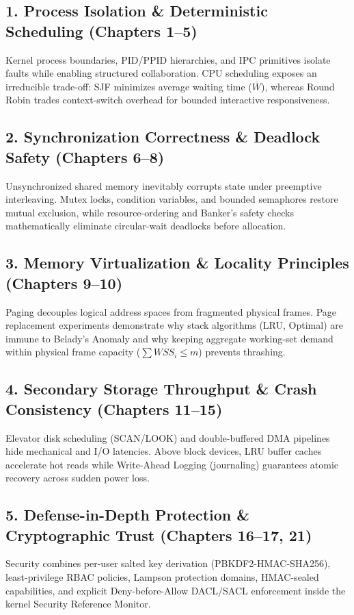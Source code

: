 \documentclass[11pt,a4paper]{report}
\begin{document}
\subsection*{1. Process Isolation \& Deterministic Scheduling (Chapters 1--5)}
Kernel process boundaries, PID/PPID hierarchies, and IPC primitives isolate faults while enabling structured collaboration. CPU scheduling exposes an irreducible trade-off: SJF minimizes average waiting time ($\overline{W}$), whereas Round Robin trades context-switch overhead for bounded interactive responsiveness.\par
\subsection*{2. Synchronization Correctness \& Deadlock Safety (Chapters 6--8)}
Unsynchronized shared memory inevitably corrupts state under preemptive interleaving. Mutex locks, condition variables, and bounded semaphores restore mutual exclusion, while resource-ordering and Banker's safety checks mathematically eliminate circular-wait deadlocks before allocation.\par
\subsection*{3. Memory Virtualization \& Locality Principles (Chapters 9--10)}
Paging decouples logical address spaces from fragmented physical frames. Page replacement experiments demonstrate why stack algorithms (LRU, Optimal) are immune to Belady's Anomaly and why keeping aggregate working-set demand within physical frame capacity ($\sum WSS_i \le m$) prevents thrashing.\par
\subsection*{4. Secondary Storage Throughput \& Crash Consistency (Chapters 11--15)}
Elevator disk scheduling (SCAN/LOOK) and double-buffered DMA pipelines hide mechanical and I/O latencies. Above block devices, LRU buffer caches accelerate hot reads while Write-Ahead Logging (journaling) guarantees atomic recovery across sudden power loss.\par
\subsection*{5. Defense-in-Depth Protection \& Cryptographic Trust (Chapters 16--17, 21)}
Security combines per-user salted key derivation (PBKDF2-HMAC-SHA256), least-privilege RBAC policies, Lampson protection domains, HMAC-sealed capabilities, and explicit Deny-before-Allow DACL/SACL enforcement inside the kernel Security Reference Monitor.\par
\end{document}
